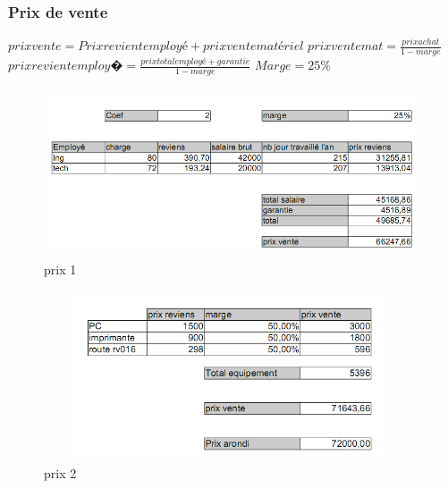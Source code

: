 \documentclass{beamer}
\begin{document}
\begin{frame}\frametitle{Prix de vente}

$ prix vente= Prix revient employé + prix vente matériel $ 
$ prix vente mat= \frac {prix achat} {1-marge} $
$ prix revient employ� = \frac {prix total employé + garantie} { 1-marge} $
$ Marge = 25\% $

\end{frame}
\begin{frame}

\begin{figure}[t]
\centering
\includegraphics[height=5cm,width=11cm]{images/prix1.PNG}
\caption{prix 1}
\label{prix 1}
\end{figure}
\end{frame}
\begin{frame}



\begin{figure}[t]
\centering
\includegraphics[height=5cm,width=11cm]{images/prix2.PNG}
\caption{prix 2}
\label{prix 2}
\end{figure}


\end{frame}
\end{document}
